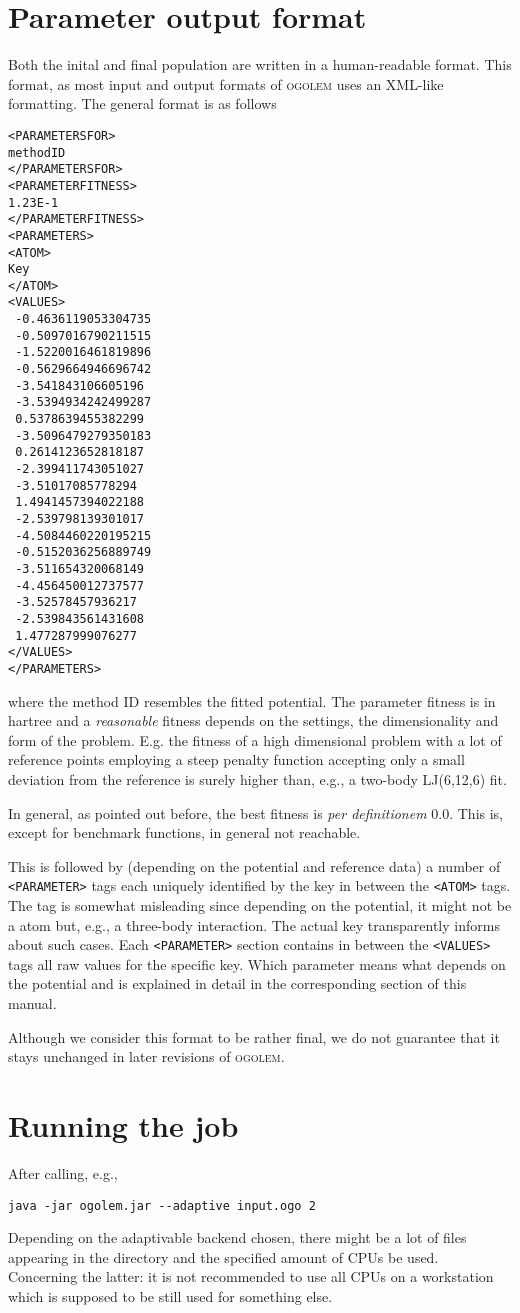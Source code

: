 \documentclass[a4paper,10pt]{scrbook}
\newcommand{\ogo}{\textsc{ogolem}}
\begin{document}
\section{Parameter output format}
Both the inital and final population are written in a human-readable format.
This format, as most input and output formats of \ogo{} uses an XML-like
formatting. The general format is as follows
\begin{verbatim}
<PARAMETERSFOR>
methodID
</PARAMETERSFOR>
<PARAMETERFITNESS>
1.23E-1
</PARAMETERFITNESS>
<PARAMETERS>
<ATOM>
Key
</ATOM>
<VALUES>
 -0.4636119053304735
 -0.5097016790211515
 -1.5220016461819896
 -0.5629664946696742
 -3.541843106605196
 -3.5394934242499287
 0.5378639455382299
 -3.5096479279350183
 0.2614123652818187
 -2.399411743051027
 -3.51017085778294
 1.4941457394022188
 -2.539798139301017
 -4.5084460220195215
 -0.5152036256889749
 -3.511654320068149
 -4.456450012737577
 -3.52578457936217
 -2.539843561431608
 1.477287999076277
</VALUES>
</PARAMETERS>
\end{verbatim}
where the method ID resembles the fitted potential. The parameter fitness is in
hartree and a \emph{reasonable} fitness depends on the settings, the
dimensionality and form of the problem. E.g. the fitness of a high dimensional
problem with a lot of reference points employing a steep penalty function
accepting only a small deviation from the reference is surely higher than, e.g.,
a two-body LJ(6,12,6) fit.

In general, as pointed out before, the best fitness is \emph{per definitionem}
0.0. This is, except for benchmark functions, in general not reachable.

This is followed by (depending on the potential and reference data) a number of
\texttt{<PARAMETER>} tags each uniquely identified by the key in between the
\texttt{<ATOM>} tags. The tag is somewhat misleading since depending on the
potential, it might not be a atom but, e.g., a three-body interaction. The
actual key transparently informs about such cases. Each \texttt{<PARAMETER>}
section contains in between the \texttt{<VALUES>} tags all raw values for the
specific key. Which parameter means what depends on the potential and is
explained in detail in the corresponding section of this manual.

Although we consider this format to be rather final, we do not guarantee that it
stays unchanged in later revisions of \ogo{}.

\section{Running the job}
After calling, e.g.,
\begin{verbatim}
java -jar ogolem.jar --adaptive input.ogo 2
\end{verbatim}
Depending on the adaptivable backend chosen, there might be a lot of files
appearing in the directory and the specified amount of CPUs be used. Concerning
the latter: it is not recommended to use all CPUs on a workstation which is
supposed to be still used for something else.
\end{document}
